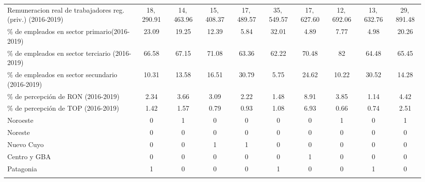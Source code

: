 \documentclass[12pt,a4paper]{article}
\begin{document}
\begin{table}
\begin{tabular}{@{\extracolsep{5pt}} lccccccccc}
Remuneracion  real de trabajadores reg. (priv.) (2016-2019) & 18$,$290.91 & 14$,$463.96 & 15$,$408.37 & 17$,$489.57 & 35$,$549.57 & 17$,$627.60 & 12$,$692.06 & 13$,$632.76 & 29$,$891.48 \\ 
\% de empleados en sector primario(2016-2019) & 23.09 & 19.25 & 12.39 & 5.84 & 32.01 & 4.89 & 7.77 & 4.98 & 20.26 \\ 
\% de empleados en sector terciario (2016-2019) & 66.58 & 67.15 & 71.08 & 63.36 & 62.22 & 70.48 & 82 & 64.48 & 65.45 \\ 
\% de empleados en sector secundario (2016-2019) & 10.31 & 13.58 & 16.51 & 30.79 & 5.75 & 24.62 & 10.22 & 30.52 & 14.28 \\ 
\% de percepción de RON (2016-2019) & 2.34 & 3.66 & 3.09 & 2.22 & 1.48 & 8.91 & 3.85 & 1.14 & 4.42 \\ 
\% de percepción de TOP  (2016-2019) & 1.42 & 1.57 & 0.79 & 0.93 & 1.08 & 6.93 & 0.66 & 0.74 & 2.51 \\ 
Noroeste & 0 & 1 & 0 & 0 & 0 & 0 & 1 & 0 & 1 \\ 
Noreste & 0 & 0 & 0 & 0 & 0 & 0 & 0 & 0 & 0 \\ 
Nuevo Cuyo & 0 & 0 & 1 & 1 & 0 & 0 & 0 & 0 & 0 \\ 
Centro y GBA & 0 & 0 & 0 & 0 & 0 & 1 & 0 & 0 & 0 \\ 
Patagonia & 1 & 0 & 0 & 0 & 1 & 0 & 0 & 1 & 0 \\ 
\hline \\[-1.8ex] 
\end{tabular} 

\end{table} 


\newpage
\printbibliography[title={Bibliografía}, heading=bibintoc]
\end{document}
